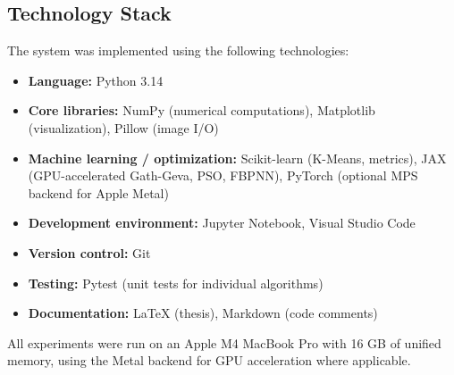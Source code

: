 \subsection{Technology Stack}

The system was implemented using the following technologies:

\begin{itemize}
    \item \textbf{Language:} Python 3.14
    
    \item \textbf{Core libraries:} NumPy (numerical computations), Matplotlib (visualization), Pillow (image I/O)
    
    \item \textbf{Machine learning / optimization:} Scikit-learn (K-Means, metrics), JAX (GPU-accelerated Gath-Geva, PSO, FBPNN), PyTorch (optional MPS backend for Apple Metal)
    
    \item \textbf{Development environment:} Jupyter Notebook, Visual Studio Code
    
    \item \textbf{Version control:} Git
    
    \item \textbf{Testing:} Pytest (unit tests for individual algorithms)
    
    \item \textbf{Documentation:} LaTeX (thesis), Markdown (code comments)
\end{itemize}

All experiments were run on an Apple M4 MacBook Pro with 16 GB of unified memory, using the Metal backend for GPU acceleration where applicable.